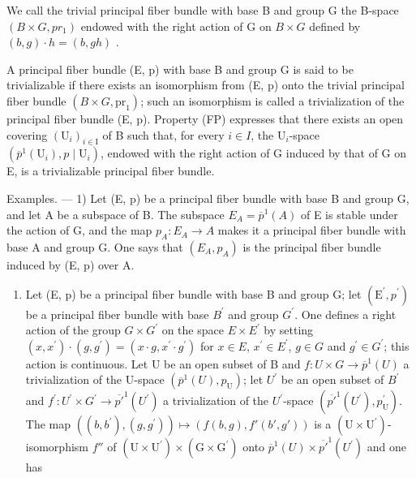We call the trivial principal fiber bundle with base B and group G the B-space \((B \times G, pr_{1})\) endowed with the right action of G on \(B \times G\) defined by \((b, g) \cdot h = (b, gh)\) .

A principal fiber bundle (E, p) with base B and group G is said to be trivializable if there exists an isomorphism from (E, p) onto the trivial principal fiber bundle \((B \times G,\mathrm{pr}_{1})\); such an isomorphism is called a trivialization of the principal fiber bundle (E, p). Property (FP) expresses that there exists an open covering \((\mathrm{U}_{i})_{i \in \mathrm{I}}\) of B such that, for every \(i \in I\), the \(\mathrm{U}_{i}\)-space \((\overline{p}^{1}(\mathrm{U}_{i}), p \mid \mathrm{U}_{i})\), endowed with the right action of G induced by that of G on E, is a trivializable principal fiber bundle.

Examples. --- 1) Let (E, p) be a principal fiber bundle with base B and group G, and let A be a subspace of B. The subspace \(E_{A} = \overline{p}^{1}(A)\) of E is stable under the action of G, and the map \(p_{A}: E_{A} \to A\) makes it a principal fiber bundle with base A and group G. One says that \((E_{A}, p_{A})\) is the principal fiber bundle induced by (E, p) over A.

\begin{enumerate}
\def\labelenumi{\arabic{enumi})}
\setcounter{enumi}{1}
\tightlist
\item
  Let (E, p) be a principal fiber bundle with base B and group G; let \((\mathrm{E}^{\prime}, p^{\prime})\) be a principal fiber bundle with base \(B^{\prime}\) and group \(G^{\prime}\). One defines a right action of the group \(G \times G^{\prime}\) on the space \(E \times E^{\prime}\) by setting \((x, x^{\prime}) \cdot (g, g^{\prime}) = (x \cdot g, x^{\prime} \cdot g^{\prime})\) for \(x \in E\), \(x^{\prime} \in E^{\prime}\), \(g \in G\) and \(g^{\prime} \in G^{\prime}\); this action is continuous. Let U be an open subset of B and \(f: U \times G \to \overline{p}^{1}(U)\) a trivialization of the U-space \((\overline{p}^{1}(U), p_{\mathrm{U}})\); let \(U^{\prime}\) be an open subset of \(B^{\prime}\) and \(f^{\prime}: U^{\prime} \times G^{\prime} \to \overline{p'}^{1}(U^{\prime})\) a trivialization of the \(U^{\prime}\)-space \((\overline{p'}^{1}(U^{\prime}), p_{\mathrm{U}}^{\prime})\). The map \(((b, b^{\prime}), (g, g^{\prime})) \mapsto (f(b, g), f'(b', g'))\) is a \((\mathrm{U} \times \mathrm{U}^{\prime})\)-isomorphism \(f''\) of \((\mathrm{U} \times \mathrm{U}^{\prime}) \times (\mathrm{G} \times \mathrm{G}^{\prime})\) onto \(\overline{p}^{1}(U) \times \overline{p'}^{1}(U^{\prime})\) and one has
\end{enumerate}

